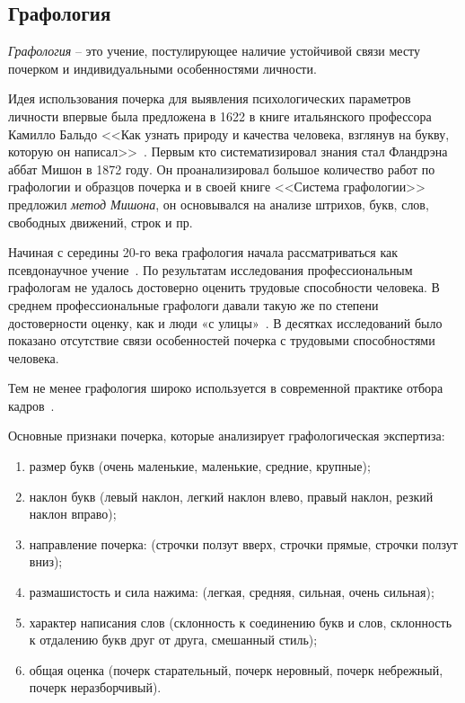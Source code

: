 \subsection{Графология}
\label{sub:domain:grafologic}
\emph{Графология} – это учение, постулирующее наличие устойчивой связи месту почерком и индивидуальными особенностями личности.

Идея использования почерка для выявления психологических параметров личности впервые была предложена в 1622 в книге итальянского профессора Камилло Бальдо <<Как узнать природу и качества человека, взглянув на букву, которую он написал>>~\cite{kamillo_grafology}. Первым кто систематизировал знания стал Фландрэна аббат Мишон в 1872 году. Он проанализировал большое количество работ по графологии и образцов почерка и в своей книге <<Система графологии>> предложил \emph{метод Мишона}, он основывался на анализе штрихов, букв, слов, свободных движений, строк и пр.~\cite{mishon_grafology}

Начиная с середины 20-го века графология начала рассматриваться как псевдонаучное учение~\cite{graphology_wiki}. По результатам исследования профессиональным графологам не удалось достоверно оценить трудовые способности человека. В среднем профессиональные графологи давали такую же по степени достоверности оценку, как и люди «с улицы»~\cite{neter_shakhar_psevdograph, king_koehler_psevdograph}. В десятках исследований было показано отсутствие связи особенностей почерка с трудовыми способностями человека.

Тем не менее графология широко используется в современной практике отбора кадров~\cite{graphology_psyfactor}.

Основные признаки почерка, которые анализирует графологическая экспертиза:
\begin{enumerate}
  \item размер букв (очень маленькие, маленькие, средние, крупные);
  \item наклон букв (левый наклон, легкий наклон влево, правый наклон, резкий наклон вправо);
  \item направление почерка: (строчки ползут вверх, строчки прямые,  строчки ползут вниз);
  \item размашистость и сила нажима: (легкая, средняя, сильная, очень сильная);
  \item характер написания слов (склонность к соединению букв и слов, склонность к отдалению букв друг от друга, смешанный стиль);
  \item общая оценка (почерк старательный, почерк неровный, почерк небрежный, почерк неразборчивый).
\end{enumerate}

